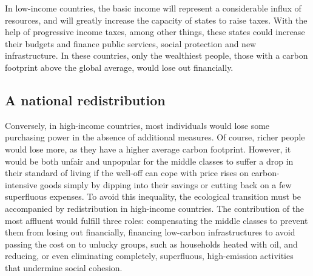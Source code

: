 \documentclass[a5paper,english,openany]{memoir}
\begin{document}
In low-income countries, the basic income will represent a considerable influx of resources, and will greatly increase the capacity of states to raise taxes. With the help of progressive income taxes, among other things, %
these states could increase their budgets and finance public services, social protection and new %
infrastructure. In these countries, only the wealthiest people, those with a carbon footprint above the global average, %
would lose out financially. 

\subsection*{A national redistribution} %
Conversely, %
in high-income countries, most individuals would lose some %
purchasing power in the absence of additional measures. Of course, richer people would lose more, as they have a higher average carbon footprint. However, it would be both unfair and unpopular for the middle classes to suffer a drop in their standard of living if the well-off can cope with price rises on carbon-intensive goods simply by dipping into their savings or cutting back on a few superfluous expenses. To avoid this inequality, the ecological transition %
must be accompanied by redistribution in high-income countries. The contribution of the most affluent would fulfill %
three roles: compensating the middle classes to prevent them from losing out financially, financing low-carbon infrastructures to avoid passing the cost on to unlucky groups, such as households heated with oil, %
and reducing, or even eliminating completely, %
superfluous, high-emission activities that undermine social cohesion.
\end{document}
